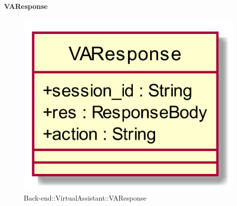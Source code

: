 \hypertarget{VAResponse_label}{\paragraph{VAResponse}}
\begin{figure}[h]
	\centering
	\includegraphics[width=\textwidth,height=\textheight,keepaspectratio]{images/ClassVAResponse.png}
	\caption{Back-end::VirtualAssistant::VAResponse}
\end{figure}
